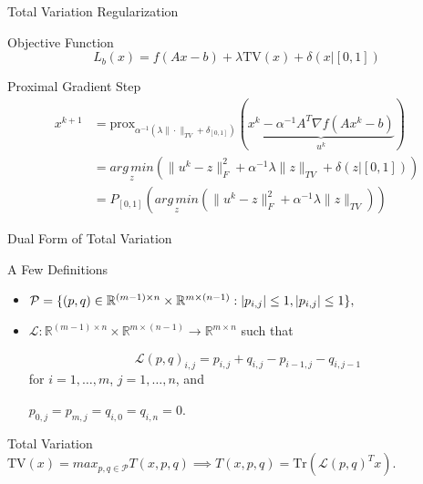 \documentclass[12pt]{beamer}
\DeclarePairedDelimiter{\abs}{\lvert}{\rvert}
\newcommand{\R}{\mathbb{R}}
\newcommand{\AMz}{\underset{z}{arg\, min}}
\newcommand{\prox}{\text{prox}}
\begin{document}
\begin{frame}{Total Variation Regularization}

\begin{exampleblock}{Objective Function}
$$
L_b(x) = f(Ax-b) + \lambda \mathrm{TV}(x) + \delta(x | [0,1])
$$
\end{exampleblock}

\begin{exampleblock}{Proximal Gradient Step}
\begin{align*}
x^{k+1} &= \prox_{\alpha^{-1}(\lambda \|\cdot \|_{TV} + \delta_{[0,1]})} (\underbrace{x^k - \alpha^{-1} A^T\nabla f (Ax^k - b)}_{u^k}) \\
&= \AMz \left( \|u^k - z\|_F^2 + \alpha^{-1}\lambda \|z\|_{TV} + \delta(z | [0,1]) \right) \\
&= P_{[0,1]}  \left( \AMz \left( \|u^k - z\|_F^2 + \alpha^{-1}\lambda \|z\|_{TV} \right) \right)
\end{align*}
\end{exampleblock}

\end{frame}

\begin{frame}{Dual Form of Total Variation}

\begin{exampleblock}{A Few Definitions}
\begin{itemize}

\item $\mathcal{P} = \{ (p,q) \in \R^{(m-1) \times n} \times \R^{ m \times (n-1) } :  \abs{p_{i,j} } \le 1, \abs{p_{ i,j } } \le 1 \},$

\item $ \mathcal{L} : \R^{(m-1) \times n} \times \R^{ m \times (n-1) } \rightarrow \R^{m \times n}$ such that

$$ \mathcal{L}(p,q)_{i,j} = p_{i,j} + q_{i,j} - p_{ i-1,j } - q_{ i,j-1 }$$ for $i = 1,\dots,m$, $j = 1,\dots,n$, and 

$ p_{0,j} = p_{m,j} = q_{i,0} = q_{i,n} = 0.$ 
\end{itemize}
\end{exampleblock}

\begin{exampleblock}{Total Variation}
$ \mathrm{TV}(x) = max_{p,q \in \mathcal{P}} T(x, p,q) \implies T(x,p,q) = \mathrm{Tr} ( \mathcal{L}(p,q)^T x ).$
\end{exampleblock}

\end{frame}
\end{document}

